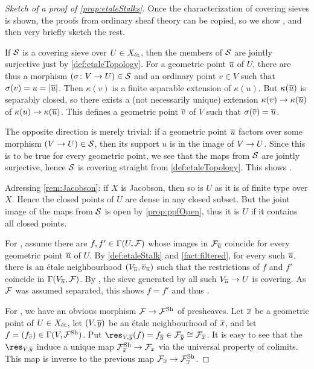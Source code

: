 \begin{proof}[Sketch of a proof of \cref{prop:etaleStalks}]
	Once the characterization of covering sieves is shown, the proofs from ordinary sheaf theory can be copied, so we show , and then very briefly sketch the rest.
	
	If $\mathcal{S}$ is a covering sieve over $U\in X_{\mathrm{\acute{e}t}}$, then the members of $\mathcal{S}$ are jointly surjective just by \cref{def:etaleTopology}. For a geometric point $\ov{u}$ of $U$, there are thus a morphism $(\sigma\colon V\morphism U)\in\Ss$ and an ordinary point $v\in V$ such that $\sigma(v)=u=|\ov{u}|$. Then $\kappa(v)$ is a finite separable extension of $\kappa(u)$. But $\kappa(\ov{u})$ is separably closed, so there exists a (not necessarily unique) extension $\kappa(v)\morphism \kappa(\ov{u})$ of $\kappa(u)\morphism \kappa(\ov{u})$. This defines a geometric point $\ov{v}$ of $V$ such that $\sigma (\ov{v})=\ov{u}$.
	
	The opposite direction is merely trivial: if a geometric point $\ov{u}$ factors over some morphism $(V\morphism U)\in \Ss$, then its support $u$ is in the image of $V\morphism U$. Since this is to be true for every geometric point, we see that the maps from $\mathcal{S}$ are jointly surjective, hence $\mathcal{S}$ is covering straight from \cref{def:etaleTopology}. This shows .
	
	Adressing \cref{rem:Jacobson}: if $X$ is Jacobson, then so is $U$ as it is of finite type over $X$. Hence the closed points of $U$ are dense in any closed subset. But the joint image of the maps from $\mathcal{S}$ is open by \cref{prop:ppfOpen}, thus it is $U$ if it contains all closed points.
	
	For , assume there are $f,f'\in\operatorname{\Gamma}(U,\mathcal{F})$ whose images in $\Ff_{\ov{u}}$ coincide for every geometric point $\ov{u}$ of $U$. By \cref{def:etaleStalk} and \cref{fact:filtered}, for every such $\ov{u}$, there is an étale neighbourhood $(V_{\ov{u}},\ov{v}_{\ov{u}})$ such that the restrictions of $f$ and $f'$ coincide in $\Global(V_{\ov{u}},\Ff)$. By , the sieve generated by all such $V_{\ov{u}}\morphism U$ is covering. As $\mathcal{F}$ was assumed separated, this shows $f=f'$ and thus .
	
	For , we have an obvious morphism $\Ff\morphism\Ff^\Sh$ of presheaves. Let $\ov{x}$ be a geometric point of $U\in X_{\mathrm{\acute{e}t}}$, let $(V,\ov{y})$ be an étale neighbourhood of $\ov{x}$, and let $f=(f_{\ov{v}})\in\Global(V,\Ff^\Sh)$. Put $\res_{V,\ov{y}}(f)=f_{\ov{y}}\in\Ff_{\ov{y}}\cong \Ff_{\ov{x}}$. It is easy to see that the $\res_{V,\ov{y}}$ induce a unique map $\Ff_{\ov{x}}^\Sh\morphism \Ff_x$ via the universal property of colimits. This map is inverse to the previous map $\Ff_{\ov{x}}\morphism\Ff_{\ov{x}}^\Sh$.
	

\end{proof}
